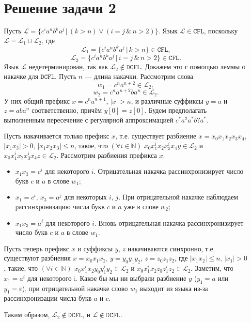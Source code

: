 \documentclass{article}
\begin{document}
\section{Решение задачи 2}

Пусть $\mathcal{L} = \{c^i a^n b^k a^j \, | \, (k > n) \lor (i = j \, \& \,
n > 2)\}$. Язык $\mathcal{L} \in \mathtt{CFL}$, поскольку $\mathcal{L} =
\mathcal{L}_1 \cup \mathcal{L}_2$, где
\[\mathcal{L}_1 = \{c^i a^n b^k a^j \, | \, k > n\} \in \mathtt{CFL},\]
\[\mathcal{L}_2 = \{c^i a^n b^k a^j \, | \, i = j \, \& \, n > 2 \} \in \mathtt{CFL}.\]
Язык $\mathcal{L}$ недетерминирован, так как $\mathcal{L}_2 \notin \mathtt{DCFL}$.
Докажем это с помощью леммы о накачке для $\mathtt{DCFL}$. Пусть $n$ --- длина
накачки. Рассмотрим слова
\[w_1 = c^n a^{n+2} \in \mathcal{L}_2,\]
\[w_2 = c^n a^{n+2} b a^n \in \mathcal{L}_2.\]
У них общий префикс $x = c^n a^{n+1}$, $|x| > n$, и различные суффиксы
$y = a$ и $z = a b a^n$ соответственно, причём $y[0] = z[0]$. Будем предполагать
выполненным пересечение с регулярной аппроксимацией $c^* a^2 a^* b? a^*$.

Пусть накачивается только префикс $x$, т.е. существует разбиение $x = x_0 x_1 x_2 x_3
x_4$, $|x_1 x_3| > 0$, $|x_1 x_2 x_3| \le n$, такое, что $(\forall i \in
\mathbb{N})$ $x_0 x_1^i x_2 x_3^i x_4 y \in \mathcal{L}_2$ и $x_0 x_1^i x_2
x_3^i x_4 z \in \mathcal{L}_2$. Рассмотрим разбиения префикса $x$.
\begin{itemize}
  \item $x_1 x_3 = c^i$ для некоторого $i$. Отрицательная накачка
    рассинхронизирует число букв $c$ и $a$ в слове $w_1$;
  \item $x_1 = c^i$, $x_3 = a^j$ для некоторых $i$, $j$. При отрицательной
    накачке наблюдаем рассинхронизацию числа букв $c$ и $a$ уже в слове $w_2$;
  \item $x_1 x_3 = a^i$ для некоторого $i$. Вновь отрицательная накачка
    рассинхронизирует число букв $c$ и $a$ в слове $w_1$.
\end{itemize}
Пусть теперь префикс $x$ и суффиксы $y$, $z$ накачиваются синхронно, т.е.
существуют разбиения $x = x_0 x_1 x_2$, $y = y_0 y_1 y_2$, $z = z_0 z_1 z_2$,
где $|x_1 x_2| \le n$, $|x_1| > 0$, такие, что $(\forall i \in \mathbb{N})$
$x_0 x_1^i x_2 y_0 y_1^i y_2 \in \mathcal{L}_2$ и $x_0 x_1^i x_2 z_0 z_1^i z_2
\in \mathcal{L}_2$. Заметим, что $x_1 = a^i$ для некоторого i. Какое бы мы ни
выбрали разбиение $y$ ($y_1 = a$ или $y_1 = \varepsilon$), при отрицательной
накачке слово $w_1$ выходит из языка из-за рассинхронизации числа букв $a$ и
$c$.

Таким образом, $\mathcal{L}_2 \notin \mathtt{DCFL}$, и $\mathcal{L} \notin
\mathtt{DCFL}$.
\end{document}
